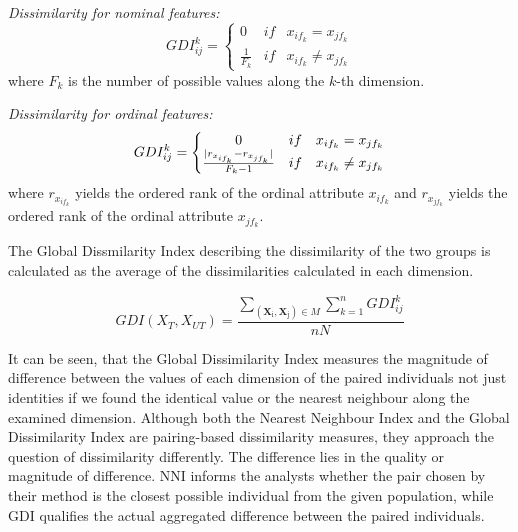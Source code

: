 \vspace{0.3cm}
\noindent\emph{Dissimilarity for nominal features:}
\begin{equation}
	GDI_{ij}^k=\left\{\begin{matrix}
	0 & if & x_{if_k}=x_{jf_k}\\ 
	\frac{1}{F_k} & if & x_{if_k} \neq x_{jf_k} 
	\end{matrix}\right.\label{eq:ddi_nom}
\end{equation}
where $F_k$ is the number of possible values along the $k$-th dimension.

\vspace{0.3cm}
\noindent\emph{Dissimilarity for ordinal features:}
\begin{equation}
	GDI_{ij}^k=\left\{\begin{matrix}
	0 & if & x_{if_k}=x_{jf_k}\\ 
	\frac{\lvert r_{x_{if_k}}-r_{x_{jf_k}}\rvert}{F_k-1} & if & x_{if_k} \neq x_{jf_k} 
	\end{matrix}\right.\label{eq:ddi_ord}
\end{equation}
where $r_{x_{if_k}}$ yields the ordered rank of the ordinal attribute $x_{if_k}$ and $r_{x_{jf_k}}$ yields the ordered rank of the ordinal attribute $x_{jf_k}$.

The Global Dissmilarity Index describing the dissimilarity of the two groups is calculated as the average of the dissimilarities calculated in each dimension.

\begin{equation}
	GDI(X_T,X_{UT})=\frac{\sum_{(\bm{\mathrm{\textbf{X}_i}}, \bm{\mathrm{\textbf{X}_j}})\in M}\sum_{k=1}^nGDI_{ij}^k}{nN}\label{eq:f_ddi}
\end{equation}

\vspace{0.5cm}
It can be seen, that the Global Dissimilarity Index measures the magnitude of difference between the values of each dimension of the paired individuals not just identities if we found the identical value or the nearest neighbour along the examined dimension. Although both the Nearest Neighbour Index and the Global Dissimilarity Index are pairing-based dissimilarity measures, they approach the question of dissimilarity differently. The difference lies in the quality or magnitude of difference. NNI informs the analysts whether the pair chosen by their method is the closest possible individual from the given population, while GDI qualifies the actual aggregated difference between the paired individuals.

